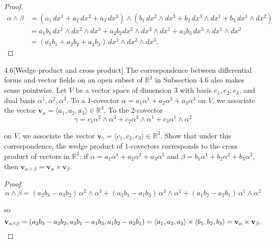 \begin{proof}
    \begingroup
    \allowdisplaybreaks%
    \begin{align*}
        \alpha \wedge \beta & = (a_{1}\,dx^{1} + a_{2}\,dx^{2} + a_{3}\,dx^{3}) \wedge (b_{1}\,dx^{2} \wedge dx^{3} + b_{2}\,dx^{3} \wedge dx^{1} + b_{3}\,dx^{1} \wedge dx^{2})  \\
                            & = a_{1}b_{1}\, dx^{1} \wedge dx^{2} \wedge dx^{3} + a_{2}b_{2} dx^{2} \wedge dx^{3} \wedge dx^{1} + a_{3}b_{3}\, dx^{3} \wedge dx^{1} \wedge dx^{2} \\
                            & = (a_{1}b_{1} + a_{2}b_{2} + a_{3}b_{3})\, dx^{1} \wedge dx^{2} \wedge dx^{3}.
    \end{align*}
    \endgroup
\end{proof}

\begin{problem}{4.6}[Wedge product and cross product]
The correspondence between differential forms and vector fields on an open subset of \(\mathbb{R}^{3}\) in Subsection 4.6 also makes sense pointwise. Let \(V\) be a vector space of dimension 3 with basis \(e_{1}, e_{2}, e_{3}\), and dual basis \(\alpha^{1}, \alpha^{2}, \alpha^{3}\). To a 1-covector \(\alpha = a_{1} \alpha^{1} + a_{2} \alpha^{2} + a_{3} \alpha^{3}\) on \(V\), we associate the vector \(\mathbf{v}_{\alpha} = \langle a_{1}, a_{2}, a_{3} \rangle \in \mathbb{R}^{3}\). To the 2-covector
\[
    \gamma = c_{1} \alpha^{2} \wedge \alpha^{3} + c_{2} \alpha^{3} \wedge \alpha^{1} + c_{3} \alpha^{1} \wedge \alpha^{2}
\]

on \(V\), we associate the vector \(\mathbf{v}_{\gamma} = \langle c_{1}, c_{2}, c_{3} \rangle \in \mathbb{R}^{3}\). Show that under this correspondence, the wedge product of 1-covectors corresponds to the cross product of vectors in \(\mathbb{R}^{3}\): if \(\alpha = a_{1} \alpha^{1} + a_{2} \alpha^{2} + a_{3} \alpha^{3}\) and \(\beta = b_{1} \alpha^{1} + b_{2} \alpha^{2} + b_{3} \alpha^{3}\), then \(\mathbf{v}_{\alpha \wedge \beta} = \mathbf{v}_{\alpha} \times \mathbf{v}_{\beta}\).
\end{problem}

\begin{proof}
    \[ \alpha \wedge \beta = (a_{2}b_{3} - a_{3}b_{2})\, \alpha^{2} \wedge \alpha^{3} + (a_{3}b_{1} - a_{1}b_{3})\, \alpha^{3}\wedge \alpha^{1} + (a_{1}b_{2} - a_{2}b_{1})\, \alpha^{1} \wedge \alpha^{2} \]

    so
    \[
        \mathbf{v}_{\alpha\wedge \beta} = (a_{2}b_{3} - a_{3}b_{2}, a_{3}b_{1} - a_{1}b_{3}, a_{1}b_{2} - a_{2}b_{1}) = \left\langle{a_{1}, a_{2}, a_{3}}\right\rangle \times \left\langle{b_{1}, b_{2}, b_{3}}\right\rangle = \mathbf{v}_{\alpha} \times \mathbf{v}_{\beta}.\qedhere
    \]
\end{proof}

